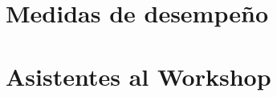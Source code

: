 \documentclass{article}[H]
\begin{document}


\section{Medidas de desempeño}





\section{Asistentes al Workshop}





\end{document}
